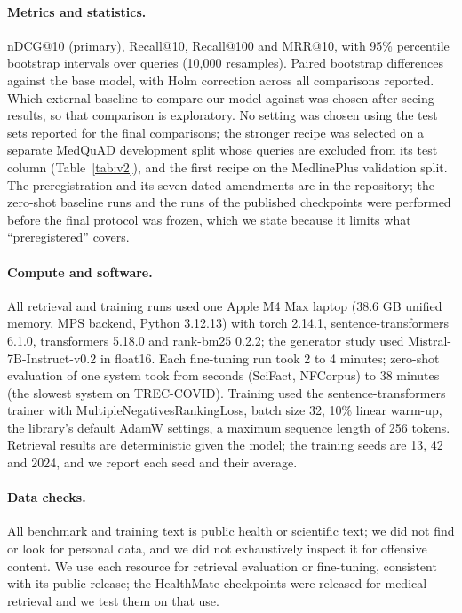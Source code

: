 \documentclass[11pt]{article}
\begin{document}
\paragraph{Metrics and statistics.} nDCG@10 (primary), Recall@10, Recall@100 and MRR@10, with 95\% percentile bootstrap intervals over queries (10,000 resamples). Paired bootstrap differences against the base model, with Holm correction across all comparisons reported. Which external baseline to compare our model against was chosen after seeing results, so that comparison is exploratory. No setting was chosen using the test sets reported for the final comparisons; the stronger recipe was selected on a separate MedQuAD development split whose queries are excluded from its test column (Table~\ref{tab:v2}), and the first recipe on the MedlinePlus validation split. The preregistration and its seven dated amendments are in the repository; the zero-shot baseline runs and the runs of the published checkpoints were performed before the final protocol was frozen, which we state because it limits what ``preregistered'' covers.

\paragraph{Compute and software.} All retrieval and training runs used one Apple M4 Max laptop (38.6 GB unified memory, MPS backend, Python 3.12.13) with torch 2.14.1, sentence-transformers 6.1.0, transformers 5.18.0 and rank-bm25 0.2.2; the generator study used Mistral-7B-Instruct-v0.2 in float16. Each fine-tuning run took 2 to 4 minutes; zero-shot evaluation of one system took from seconds (SciFact, NFCorpus) to 38 minutes (the slowest system on TREC-COVID). Training used the sentence-transformers trainer with MultipleNegativesRankingLoss, batch size 32, 10\% linear warm-up, the library's default AdamW settings, a maximum sequence length of 256 tokens. Retrieval results are deterministic given the model; the training seeds are 13, 42 and 2024, and we report each seed and their average.

\paragraph{Data checks.} All benchmark and training text is public health or scientific text; we did not find or look for personal data, and we did not exhaustively inspect it for offensive content. We use each resource for retrieval evaluation or fine-tuning, consistent with its public release; the HealthMate checkpoints were released for medical retrieval and we test them on that use.
\end{document}
